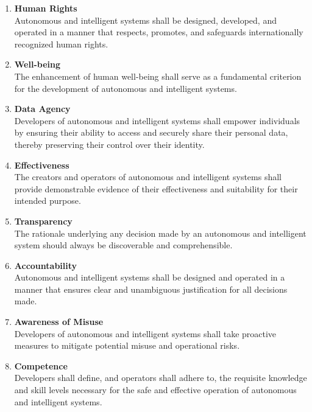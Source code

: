 \begin{enumerate}
    \item \textbf{Human Rights}\\
    Autonomous and intelligent systems shall be designed, developed, and operated in a manner that respects, promotes, and safeguards internationally recognized human rights.
    
    \item \textbf{Well-being}\\
    The enhancement of human well-being shall serve as a fundamental criterion for the development of autonomous and intelligent systems.
    
    \item \textbf{Data Agency}\\
    Developers of autonomous and intelligent systems shall empower individuals by ensuring their ability to access and securely share their personal data, thereby preserving their control over their identity.
    
    \item \textbf{Effectiveness}\\
    The creators and operators of autonomous and intelligent systems shall provide demonstrable evidence of their effectiveness and suitability for their intended purpose.
    
    \item \textbf{Transparency}\\
    The rationale underlying any decision made by an autonomous and intelligent system should always be discoverable and comprehensible.
    
    \item \textbf{Accountability}\\
    Autonomous and intelligent systems shall be designed and operated in a manner that ensures clear and unambiguous justification for all decisions made.
    
    \item \textbf{Awareness of Misuse}\\
    Developers of autonomous and intelligent systems shall take proactive measures to mitigate potential misuse and operational risks.
    
    \item \textbf{Competence}\\
    Developers shall define, and operators shall adhere to, the requisite knowledge and skill levels necessary for the safe and effective operation of autonomous and intelligent systems.
\end{enumerate}

